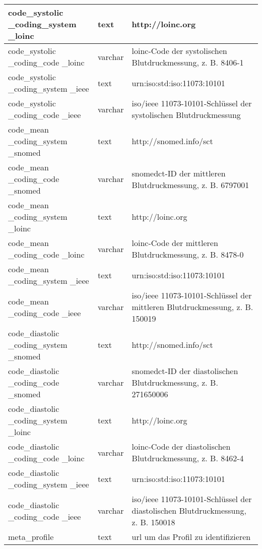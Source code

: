 \begin{longtable}{|p{3.5cm}|l|p{6.7cm}|}
		code\_systolic \_coding\_system \_loinc & text & http://loinc.org \\ \hline
		code\_systolic \_coding\_code \_loinc & varchar & \ac{loinc}-Code der systolischen Blutdruckmessung, z. B. 8406-1 \\ \hline
		code\_systolic \_coding\_system \_ieee & text & urn:iso:std:iso:11073:10101 \\ \hline
		code\_systolic \_coding\_code \_ieee & varchar & \ac{iso}/\ac{ieee} 11073-10101\texttrademark{}-Schlüssel der systolischen Blutdruckmessung \\ \hline
		code\_mean \_coding\_system \_snomed & text & http://snomed.info/sct \\ \hline
		code\_mean \_coding\_code \_snomed & varchar & \ac{snomedct}-ID der mittleren Blutdruckmessung, z. B. 6797001 \\ \hline
		code\_mean \_coding\_system \_loinc & text & http://loinc.org \\ \hline
		code\_mean \_coding\_code \_loinc & varchar & \ac{loinc}-Code der mittleren Blutdruckmessung, z. B. 8478-0 \\ \hline
		code\_mean \_coding\_system \_ieee & text & urn:iso:std:iso:11073:10101 \\ \hline
		code\_mean \_coding\_code \_ieee & varchar & \ac{iso}/\ac{ieee} 11073-10101\texttrademark{}-Schlüssel der mittleren Blutdruckmessung, z. B. 150019 \\ \hline
		code\_diastolic \_coding\_system \_snomed & text & http://snomed.info/sct \\ \hline
		code\_diastolic \_coding\_code \_snomed & varchar & \ac{snomedct}-ID der diastolischen Blutdruckmessung, z. B. 271650006 \\ \hline
		code\_diastolic \_coding\_system \_loinc & text & http://loinc.org \\ \hline
		code\_diastolic \_coding\_code \_loinc & varchar & \ac{loinc}-Code der diastolischen Blutdruckmessung, z. B. 8462-4 \\ \hline
		code\_diastolic \_coding\_system \_ieee & text & urn:iso:std:iso:11073:10101 \\ \hline
		code\_diastolic \_coding\_code \_ieee & varchar & \ac{iso}/\ac{ieee} 11073-10101\texttrademark{}-Schlüssel der diastolischen Blutdruckmessung, z. B. 150018 \\ \hline
		meta\_profile & text &  \ac{url} um das Profil zu identifizieren \\ \hline
\end{longtable}
